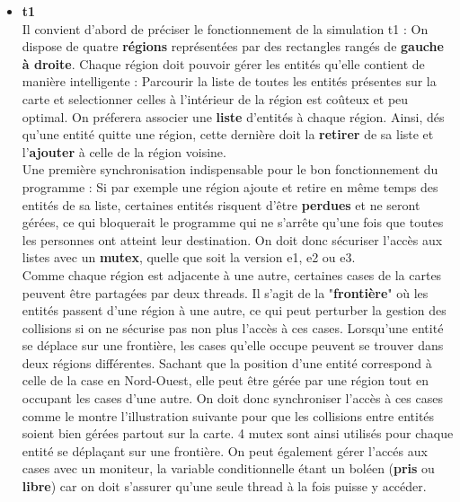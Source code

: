 \documentclass[11pt]{article} %
\begin{document}
\begin{itemize}
	\item \textbf {t1} \\
	Il convient d'abord de préciser le fonctionnement de la simulation t1 : On dispose de quatre \textbf{régions} représentées par des rectangles rangés de \textbf{gauche à droite}. Chaque région doit pouvoir gérer les entités qu'elle contient de manière intelligente : Parcourir la liste de toutes les entités présentes sur la carte et selectionner celles à l'intérieur de la région est coûteux et peu optimal. On préferera  associer une \textbf{liste} d'entités à chaque région. Ainsi, dés qu'une entité quitte une région, cette dernière doit la \textbf{retirer} de sa liste et l'\textbf{ajouter} à celle de la région voisine. \\

Une première synchronisation indispensable pour le bon fonctionnement du programme : Si par exemple une région ajoute et retire en même temps des entités de sa liste, certaines entités risquent d'être \textbf{perdues} et ne seront gérées, ce qui bloquerait le programme qui ne s'arrête qu'une fois que toutes les personnes ont atteint leur destination. On doit donc sécuriser l'accès aux listes avec un \textbf{mutex}, quelle que soit la version e1, e2 ou e3. \\

Comme chaque région est adjacente à une autre, certaines cases de la cartes peuvent être partagées par deux threads. Il s'agit de la "\textbf{frontière}" où les entités passent d'une région à une autre, ce qui peut perturber la gestion des collisions si on ne sécurise pas non plus l'accès à ces cases.
Lorsqu'une entité se déplace sur une frontière, les cases qu'elle occupe peuvent se trouver dans deux régions différentes. Sachant que la position d'une entité correspond à celle de la case en Nord-Ouest, elle peut être gérée par une région tout en occupant les cases d'une autre. On doit donc synchroniser l'accès à ces cases comme le montre l'illustration suivante pour que les collisions entre entités soient bien gérées partout sur la carte. 4 mutex sont ainsi utilisés pour chaque entité se déplaçant sur une frontière. On peut également gérer l'accés aux cases avec un moniteur, la variable conditionnelle étant un boléen (\textbf{pris} ou \textbf{libre}) car on doit s'assurer qu'une seule thread à la fois puisse y accéder.


\end{itemize}
\end{document}
